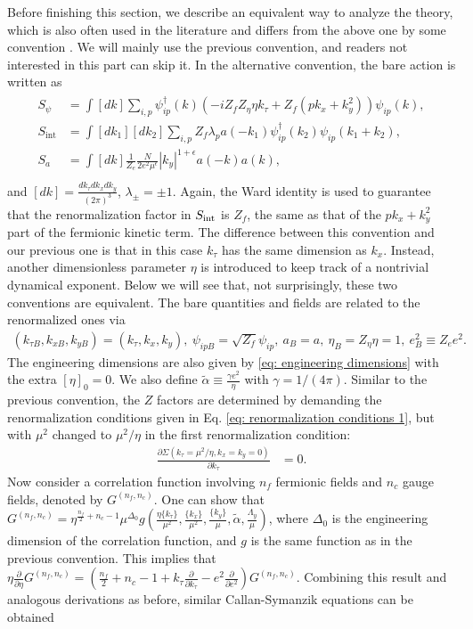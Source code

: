 \documentclass[prx,amsmath,amssymb, notitlepage, onecolumn,
nofootinbib,
superscriptaddress,
longbibliography
]{revtex4-1}
\newcommand{\beq}{\begin{eqnarray}}
\newcommand{\eeq}{\end{eqnarray}}
\begin{document}
Before finishing this section, we describe an equivalent way to analyze the theory, which is also often used in the literature and differs from the above one by some convention \cite{Lee2008, Lee2009, Metlitski2010, Mross2010, Zou2020, Zou2020a}. 
We will mainly use the previous convention, and readers not interested in this part can skip it.
In the alternative convention,
the bare action is written as
\beq\label{eq: Lagrangian of patch theory 2}
\begin{split}
	S_\psi &= \int[dk] \sum_{i,p}\psi^\dagger_{ip}(k)\left(-i Z_fZ_\eta\eta k_\tau + Z_f(p k_x + k_y^2)\right)\psi_{ip}(k),\\
	S_{\text{int}} &= \int[dk_1][dk_2] \sum_{i,p}Z_f\lambda_p a(-k_1) \psi^\dagger_{ip}(k_2) \psi_{ip}(k_1+k_2),\\
	S_a &= \int[dk]\frac{1}{Z_e} \frac{N}{2e^2\mu^\epsilon} |k_y|^{1+\epsilon} a(-k)a(k),\\
\end{split}
\eeq
and $[dk]=\frac{dk_\tau dk_x dk_y}{(2\pi)^3}$, $\lambda_\pm=\pm 1$. Again, the Ward identity is used to guarantee that the renormalization factor in $S_{\rm int}$ is $Z_f$, the same as that of the $pk_x+k_y^2$ part of the fermionic kinetic term. The difference between this convention and our previous one is that in this case $k_\tau$ has the same dimension as  $k_x$.
Instead, another dimensionless parameter $\eta$ is introduced to keep track of a nontrivial dynamical exponent. 
Below we will see that, not surprisingly, these two conventions are equivalent.
The bare quantities and fields are related to the renormalized ones via
\beq
(k_{\tau B}, k_{xB}, k_{yB})=(k_\tau, k_x, k_y),~\psi_{ip B}=\sqrt{Z_f} \psi_{ip},~a_{B}=a,~\eta_B=Z_{\eta}\eta=1,~e_{B}^2\equiv Z_{e} e^2.
\eeq
The engineering dimensions are also given by \eqref{eq: engineering dimensions} with the extra $[\eta]_0=0$. We also define $\tilde\alpha \equiv \frac{\gamma e^2}{\eta}$ with $\gamma=1/(4\pi)$.
%
Similar to the previous convention, the $Z$ factors are determined by demanding the renormalization conditions given in Eq. \eqref{eq: renormalization conditions 1}, but with $\mu^2$ changed to $\mu^2/\eta$ in the first renormalization condition:
\beq
\frac{\partial\Sigma(k_\tau=\mu^2/\eta, k_x=k_y=0)}{\partial k_\tau}&=0.
\eeq
Now consider a correlation function involving $n_f$ fermionic fields and $n_c$ gauge fields, denoted by $G^{(n_f, n_c)}$. One can show that $G^{(n_f, n_c)}=\eta^{\frac{n_f}{2}+n_c-1}\mu^{\Delta_0}g\left(\frac{\eta\{k_\tau\}}{\mu^2}, \frac{\{k_x\}}{\mu^2}, \frac{\{k_y\}}{\mu}, \tilde \alpha, \frac{\Lambda_y}{\mu}\right)$, where $\Delta_0$ is the engineering dimension of the correlation function, and $g$ is the same function as in the previous convention. This implies that $\eta\frac{\partial}{\partial\eta}G^{(n_f, n_c)}=\left(\frac{n_f}{2}+n_c-1+k_\tau\frac{\partial}{\partial k_\tau} - e^2\frac{\partial}{\partial e^2} \right)G^{(n_f, n_c)}$. Combining this result and analogous derivations as before, similar Callan-Symanzik equations can be obtained
\end{document}
